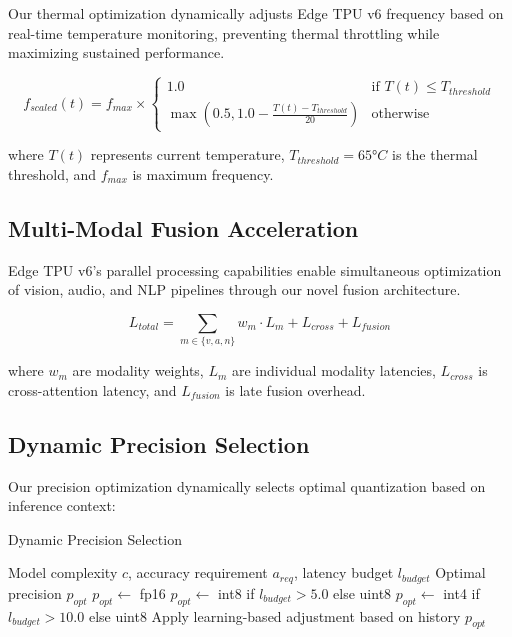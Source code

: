 \documentclass[conference]{IEEEtran}
\begin{document}
Our thermal optimization dynamically adjusts Edge TPU v6 frequency based on real-time temperature monitoring, preventing thermal throttling while maximizing sustained performance.

\begin{equation}
f_{scaled}(t) = f_{max} \times \begin{cases}
1.0 & \text{if } T(t) \leq T_{threshold} \\
\max(0.5, 1.0 - \frac{T(t) - T_{threshold}}{20}) & \text{otherwise}
\end{cases}
\end{equation}

where $T(t)$ represents current temperature, $T_{threshold} = 65°C$ is the thermal threshold, and $f_{max}$ is maximum frequency.

\subsection{Multi-Modal Fusion Acceleration}

Edge TPU v6's parallel processing capabilities enable simultaneous optimization of vision, audio, and NLP pipelines through our novel fusion architecture.

\begin{equation}
L_{total} = \sum_{m \in \{v,a,n\}} w_m \cdot L_m + L_{cross} + L_{fusion}
\end{equation}

where $w_m$ are modality weights, $L_m$ are individual modality latencies, $L_{cross}$ is cross-attention latency, and $L_{fusion}$ is late fusion overhead.

\subsection{Dynamic Precision Selection}

Our precision optimization dynamically selects optimal quantization based on inference context:

\begin{algorithm}
\caption{Dynamic Precision Selection}
\label{alg:dynamic_precision}
\begin{algorithmic}[1]
\REQUIRE Model complexity $c$, accuracy requirement $a_{req}$, latency budget $l_{budget}$
\ENSURE Optimal precision $p_{opt}$
    \STATE $p_{opt} \leftarrow$ fp16
    \STATE $p_{opt} \leftarrow$ int8 if $l_{budget} > 5.0$ else uint8
\ELSE
    \STATE $p_{opt} \leftarrow$ int4 if $l_{budget} > 10.0$ else uint8
\ENDIF
\STATE Apply learning-based adjustment based on history
\RETURN $p_{opt}$
\end{algorithmic}
\end{algorithm}
\end{document}
